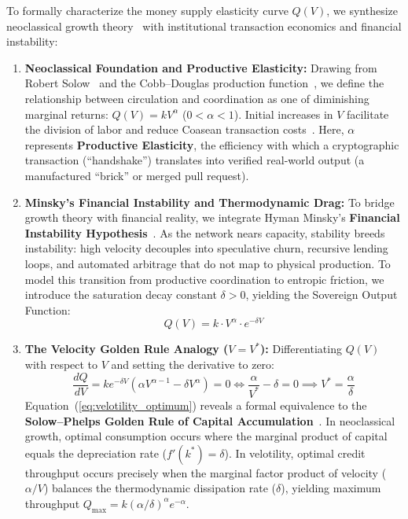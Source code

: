 \documentclass[a4paper,11pt,twoside,parskip=half-,headings=small]{scrartcl}
\begin{document}
To formally characterize the money supply elasticity curve $Q(V)$, we synthesize neoclassical growth theory~\cite{solow1956,cobbdouglas1928} with institutional transaction economics and financial instability:
\begin{enumerate}
  \item \textbf{Neoclassical Foundation and Productive Elasticity:} Drawing from Robert Solow~\cite{solow1956} and the Cobb--Douglas production function~\cite{cobbdouglas1928}, we define the relationship between circulation and coordination as one of diminishing marginal returns: $Q(V) = k V^\alpha$ ($0 < \alpha < 1$). Initial increases in $V$ facilitate the division of labor and reduce Coasean transaction costs~\cite{coase1937}. Here, $\alpha$ represents \textbf{Productive Elasticity}, the efficiency with which a cryptographic transaction (``handshake'') translates into verified real-world output (a manufactured ``brick'' or merged pull request).
  \item \textbf{Minsky's Financial Instability and Thermodynamic Drag:} To bridge growth theory with financial reality, we integrate Hyman Minsky's \textbf{Financial Instability Hypothesis}~\cite{minsky1992}. As the network nears capacity, stability breeds instability: high velocity decouples into speculative churn, recursive lending loops, and automated arbitrage that do not map to physical production. To model this transition from productive coordination to entropic friction, we introduce the saturation decay constant $\delta > 0$, yielding the Sovereign Output Function:
  \begin{equation}
    Q(V) = k \cdot V^\alpha \cdot e^{-\delta V}
  \end{equation}
  \item \textbf{The Velocity Golden Rule Analogy ($V = V^*$):} Differentiating $Q(V)$ with respect to $V$ and setting the derivative to zero:
  \begin{equation}
    \frac{dQ}{dV} = k e^{-\delta V} \left( \alpha V^{\alpha-1} - \delta V^\alpha \right) = 0 \iff \frac{\alpha}{V^*} - \delta = 0 \implies V^* = \frac{\alpha}{\delta}
    \label{eq:velotility_optimum}
  \end{equation}
  Equation~(\ref{eq:velotility_optimum}) reveals a formal equivalence to the \textbf{Solow--Phelps Golden Rule of Capital Accumulation}~\cite{solow1956,phelps1961}. In neoclassical growth, optimal consumption occurs where the marginal product of capital equals the depreciation rate ($f'(k^*) = \delta$). In velotility, optimal credit throughput occurs precisely when the marginal factor product of velocity ($\alpha / V$) balances the thermodynamic dissipation rate ($\delta$), yielding maximum throughput $Q_{\max} = k (\alpha/\delta)^\alpha e^{-\alpha}$.
\end{enumerate}
\end{document}
